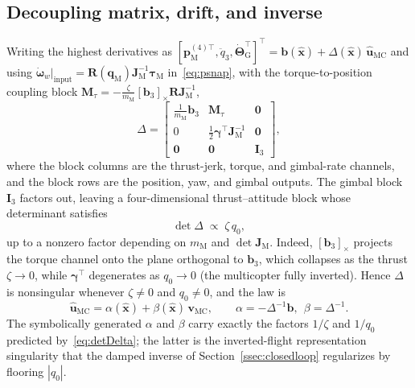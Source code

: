 \documentclass[letterpaper, 10 pt, conference]{ieeeconf}  %
\begin{document}
\subsection{Decoupling matrix, drift, and inverse}
Writing the highest derivatives as $[\mathbf{p}_\text{M}^{(4)\top},\ddot{q}_3,\dot{\boldsymbol{\Theta}}_\text{G}^\top]^\top=\mathbf{b}(\hat{\mathbf{x}})+\Delta(\hat{\mathbf{x}})\,\hat{\mathbf{u}}_\text{MC}$ and using $\dot{\boldsymbol{\omega}}_w|_{\text{input}}=\mathbf{R}(\mathbf{q}_\text{M})\mathbf{J}_\text{M}^{-1}\boldsymbol{\tau}_\text{M}$ in~\eqref{eq:psnap}, with the torque-to-position coupling block $\mathbf{M}_\tau = -\tfrac{\zeta}{m_\text{M}}[\mathbf{b}_3]_\times \mathbf{R}\mathbf{J}_\text{M}^{-1}$,
\begin{equation}
\Delta=\begin{bmatrix}
\tfrac{1}{m_\text{M}}\mathbf{b}_3 & \mathbf{M}_\tau & \mathbf{0}\\[3pt]
0 & \tfrac12\boldsymbol{\gamma}^\top\mathbf{J}_\text{M}^{-1} & \mathbf{0}\\[2pt]
\mathbf{0} & \mathbf{0} & \mathbf{I}_3
\end{bmatrix},
\label{eq:Delta_app}
\end{equation}
where the block columns are the thrust-jerk, torque, and gimbal-rate channels, and the block rows are the position, yaw, and gimbal outputs. The gimbal block $\mathbf{I}_3$ factors out, leaving a four-dimensional thrust--attitude block whose determinant satisfies
\begin{equation}
\det\Delta \;\propto\; \zeta\,q_0,
\label{eq:detDelta}
\end{equation}
up to a nonzero factor depending on $m_\text{M}$ and $\det\mathbf{J}_\text{M}$. Indeed, $[\mathbf{b}_3]_\times$ projects the torque channel onto the plane orthogonal to $\mathbf{b}_3$, which collapses as the thrust $\zeta\to0$, while $\boldsymbol{\gamma}^\top$ degenerates as $q_0\to0$ (the multicopter fully inverted). Hence $\Delta$ is nonsingular whenever $\zeta\neq0$ and $q_0\neq0$, and the law is
\begin{equation}
\hat{\mathbf{u}}_\text{MC}=\alpha(\hat{\mathbf{x}})+\beta(\hat{\mathbf{x}})\,\mathbf{v}_\text{MC},\qquad \alpha=-\Delta^{-1}\mathbf{b},\ \ \beta=\Delta^{-1}.
\end{equation}
The symbolically generated $\alpha$ and $\beta$ carry exactly the factors $1/\zeta$ and $1/q_0$ predicted by~\eqref{eq:detDelta}; the latter is the inverted-flight representation singularity that the damped inverse of Section~\ref{ssec:closedloop} regularizes by flooring $|q_0|$.



\end{document}
